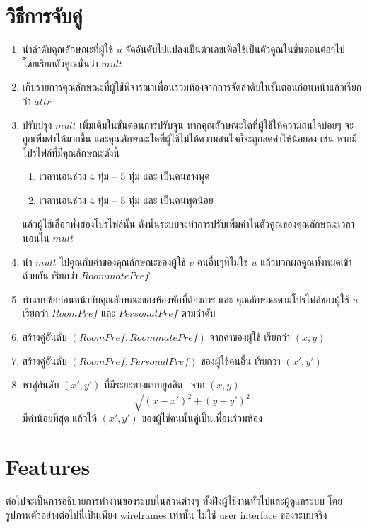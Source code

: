 \section{วิธีการจับคู่}
\begin{enumerate}
  \item นำลำดับคุณลักษณะที่ผู้ใช้ $u$ จัดอันดับไปแปลงเป็นตัวเลขเพื่อใช้เป็นตัวคูณในขั้นตอนต่อๆไป โดยเรียกตัวคูณนั้นว่า $\mathit{mult}$
  \item เก็บรายการคุณลักษณะที่ผู้ใช้พิจารณาเพื่อนร่วมห้องจากการจัดลำดับในขั้นตอนก่อนหน้าแล้วเรียกว่า $\mathit{attr}$
  \item ปรับปรุง $\mathit{mult}$ เพิ่มเติมในขั้นตอนการปรับจูน หากคุณลักษณะใดที่ผู้ใช้ให้ความสนใจบ่อยๆ จะถูกเพิ่มค่าให้มากขึ้น และคุณลักษณะใดที่ผู้ใช้ไม่ให้ความสนใจก็จะถูกลดค่าให้น้อยลง 
        เช่น หากมีโปรไฟล์ที่มีคุณลักษณะดังนี้
        \begin{enumerate}
          \item เวลานอนช่วง 4 ทุ่ม -- 5 ทุ่ม และ เป็นคนช่างพูด  
          \item เวลานอนช่วง 4 ทุ่ม -- 5 ทุ่ม และ เป็นคนพูดน้อย  
        \end{enumerate} 
        แล้วผู้ใช้เลือกทั้งสองโปรไฟล์นั้น ดังนั้นระบบจะทำการปรับเพิ่มค่าในตัวคูณของคุณลักษณะเวลานอนใน $\mathit{mult}$
  \item นำ $\mathit{mult}$ ไปคูณกับค่าของคุณลักษณะของผู้ใช้ $v$ คนอื่นๆที่ไม่ใช่ $u$ แล้วบวกผลคูณทั้งหมดเข้าด้วยกัน เรียกว่า $\mathit{RoommatePref}$
  \item ทำแบบข้อก่อนหน้ากับคุณลักษณะของห้องพักที่ต้องการ และ คุณลักษณะตามโปรไฟล์ของผู้ใช้ $u$ เรียกว่า $\mathit{RoomPref}$ และ $\mathit{PersonalPref}$ ตามลำดับ
  \item สร้างคู่อันดับ $(\mathit{RoomPref}, \mathit{RoommatePref})$ จากค่าของผู้ใช้ เรียกว่า $(x,y)$ 
  \item สร้างคู่อันดับ $(\mathit{RoomPref}, \mathit{PersonalPref})$ ของผู้ใช้คนอื่น เรียกว่า $(x',y')$
  \item หาคู่อันดับ $(x',y')$ ที่มีระยะทางแบบยูคลิด~\cite{euclid-dist} จาก $(x,y)$
  \[\sqrt{(x-x')^2 + (y-y')^2}\] มีค่าน้อยที่สุด 
  แล้วให้ $(x',y')$ ของผู้ใช้คนนั้นคู่เป็นเพื่อนร่วมห้อง
\end{enumerate}

\section{Features}
ต่อไปจะเป็นการอธิบายการทำงานของระบบในส่วนต่างๆ ทั้งฝั่งผู้ใช้งานทั่วไปและผู้ดูแลระบบ โดยรูปภาพตัวอย่างต่อไปนี้เป็นเพียง wireframes เท่านั้น ไม่ใช่ user interface ของระบบจริง

